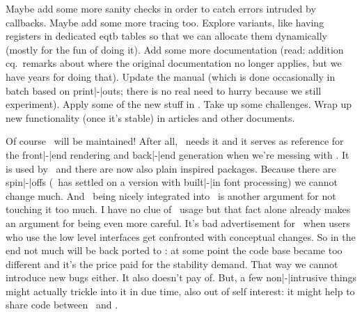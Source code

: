 \stopitemize

\starttitle[title=Todo]

\startitemize

\startitem
    Maybe add some more sanity checks in order to catch errors intruded by
    callbacks. Maybe add some more tracing too.
\stopitem
\startitem
    Explore variants, like having registers in dedicated eqtb tables so that we
    can allocate them dynamically (mostly for the fun of doing it).
\stopitem
\startitem
    Add some more documentation (read: addition cq.\ remarks about where the
    original documentation no longer applies, but we have years for doing that).
\stopitem
\startitem
    Update the manual (which is done occasionally in batch based on print|-|outs;
    there is no real need to hurry because we still experiment).
\stopitem
\startitem
    Apply some of the new stuff in \LMTX. Take up some challenges.
\stopitem
\startitem
    Wrap up new functionality (once it's stable) in articles and other documents.
\stopitem

\stopitemize

\stoptitle

\starttitle[title=And \LUATEX ?]

\startitemize

\startitem
    Of course \LUATEX\ will be maintained! After all, \MKIV\ needs it and it
    serves as reference for the front|-|end rendering and back|-|end generation
    when we're messing with \LUAMETATEX.
\stopitem
\startitem
    It is used by \LATEX\ and there are now also plain inspired packages. Because
    there are spin|-|offs (\LATEX\ has settled on a version with built|-|in font
    processing) we cannot change much.
\stopitem
\startitem
    And \LUATEX\ being nicely integrated into \TEXLIVE\ is another argument for
    not touching it too much.
\stopitem
\startitem
    I have no clue of \LUATEX\ usage but that fact alone already makes an
    argument for being even more careful. It's bad advertisement for \TEX\ when
    users who use the low level interfaces get confronted with conceptual
    changes.
\stopitem
\startitem
    So in the end not much will be back ported to \LUATEX: at some point the code
    base became too different and it's the price paid for the stability demand.
    That way we cannot introduce new bugs either. It also doesn't pay of.
\stopitem
\startitem
    But, a few non|-|intrusive things might actually trickle into it in due time,
    also out of self interest: it might help to share code between \MKIV\ and
    \LMTX.
\stopitem

\stopitemize

\stopdocument
